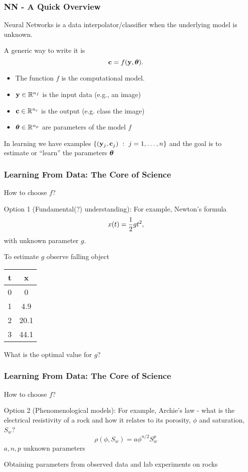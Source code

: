 \documentclass[12pt,fleqn]{beamer}
\begin{document}
\begin{frame}\frametitle{NN - A Quick Overview}

Neural Networks is a data interpolator/classifier when the underlying model
is unknown.

\bigskip

A generic way to write it is
$$ {\bf c} = f({\bf y},{\boldsymbol \theta}). $$


\begin{itemize}
\item The function $f$ is the computational model.
\item ${\bf y}\in\mathbb{R}^{n_f}$ is the input data (e.g., an image)
\item ${\bf c}\in\mathbb{R}^{n_c}$ is the output (e.g. class the image)
\item ${\boldsymbol \theta}\in\mathbb{R}^{n_p}$ are parameters of the model $f$
\end{itemize}

In learning we have examples $\{({\bf y}_j,{\bf c}_j) \ : \ j=1,\ldots,n\}$ and the goal
is to estimate or ``learn'' the parameters ${\boldsymbol \theta}$

\end{frame}


\begin{frame}\frametitle{Learning From Data: The Core of Science}


How to choose $f$?

\bigskip

Option 1 (Fundamental(?) understanding): For example, Newton's formula
$$ x(t) = {\frac 12} g t^2, $$
with unknown parameter $g$. 

\pause

To estimate $g$ observe falling object
\begin{center}
\begin{tabular}{cc}
t   &  x \\ \hline
0  &  0  \\
1  & 4.9  \\
2  & 20.1 \\
3  & 44.1 \\
\end{tabular}
\end{center}
What is the optimal value for $g$?




\end{frame}


\begin{frame}\frametitle{Learning From Data: The Core of Science}



How to choose $f$?

\bigskip

Option 2 (Phenomenological models): For example, Archie's law - what is the electrical resistivity of a rock
 and how it relates to its porosity, $\phi$ and saturation, $S_w$?
$$ \rho(\phi,S_w) = a \phi^{n/2} S_w^p $$
$a,n,p$ unknown parameters


\bigskip

Obtaining parameters from observed data and lab experiments on rocks


\end{frame}
\end{document}
